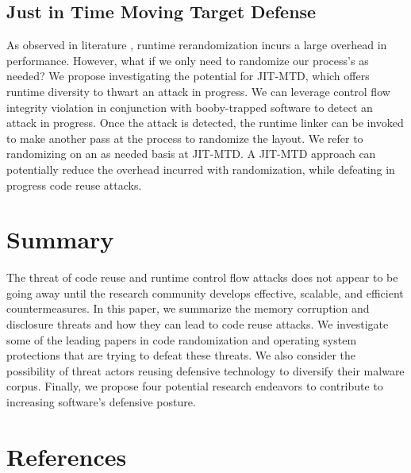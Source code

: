 \documentclass[preprint,12pt]{elsarticle}
\begin{document}
\subsection{Just in Time Moving Target Defense}

As observed in literature \cite{szekeres2013sok} \cite{crane2015readactor} \cite{friedman2015chronomorphic} \cite{hawkins2017mixr}, runtime rerandomization incurs a large overhead in performance. However, what if we only need to randomize our process's as needed? We propose investigating the potential for JIT-MTD, which offers runtime diversity to thwart an attack in progress. We can leverage control flow integrity violation in conjunction with booby-trapped software to detect an attack in progress. Once the attack is detected, the runtime linker can be invoked to make another pass at the process to randomize the layout. We refer to randomizing on an as needed basis at JIT-MTD. A JIT-MTD approach can potentially reduce the overhead incurred with randomization, while defeating in progress code reuse attacks. 

\section{Summary}
\label{S:6}

The threat of code reuse and runtime control flow attacks does not appear to be going away until the research community develops effective, scalable, and efficient countermeasures. In this paper, we summarize the memory corruption and disclosure threats and how they can lead to code reuse attacks. We investigate some of the leading papers in code randomization and operating system protections that are trying to defeat these threats. We also consider the possibility of threat actors reusing defensive technology to diversify their malware corpus. Finally, we propose four potential research endeavors to contribute to increasing software's defensive posture.


\section{References}
\label{S:7}


\end{document}
